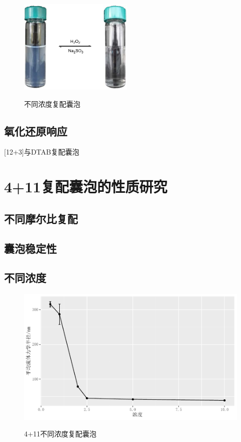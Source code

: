 \documentclass[bachelor,fandolfonts,replaceperiod]{jnuthesis}
\begin{document}
    \begin{figure}[htbp]
        \centering
        \includegraphics[height=4.5cm]{figure/redox.pdf}\\
        \caption{不同浓度复配囊泡}\label{fig:vesicle-redox}
    \end{figure}

    \subsection{氧化还原响应}
    
    
    [12+3]与DTAB复配囊泡
    
    \section{4+11复配囊泡的性质研究}
    \subsection{不同摩尔比复配}
    
    \subsection{囊泡稳定性}
    
    \subsection{不同浓度}
    \begin{figure}[htbp]
        \centering
        \includegraphics[width=0.8\linewidth]{Figure/test.pdf}\\
        \caption{4+11不同浓度复配囊泡}\label{fig:vesicle-concentration-line}
    \end{figure}
\end{document}
